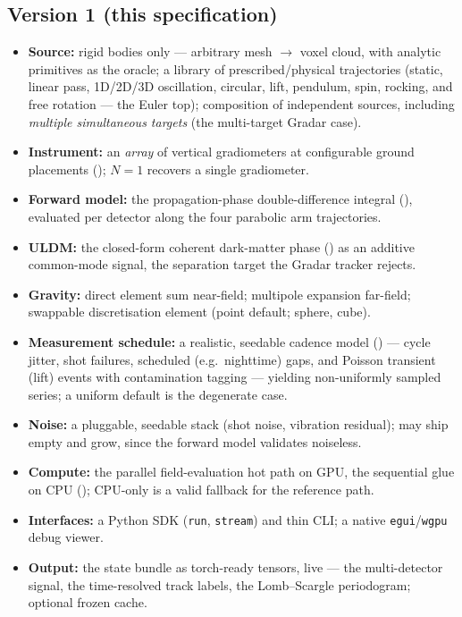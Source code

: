 \documentclass[11pt,a4paper]{article}
\theoremstyle{reqstyle}
\begin{document}
\subsection{Version 1 (this specification)}
\begin{itemize}[leftmargin=*,nosep]
\item \textbf{Source:} rigid bodies only --- arbitrary mesh $\to$ voxel cloud, with analytic
primitives as the oracle; a library of prescribed/physical trajectories (static, linear
pass, 1D/2D/3D oscillation, circular, lift, pendulum, spin, rocking, and free rotation --- the
Euler top); composition of independent sources,
including \emph{multiple simultaneous targets} (the multi-target Gradar case).
\item \textbf{Instrument:} an \emph{array} of vertical gradiometers at configurable ground
placements (); $N{=}1$ recovers a single gradiometer.
\item \textbf{Forward model:} the propagation-phase double-difference integral
(), evaluated per detector along the four parabolic arm trajectories.
\item \textbf{ULDM:} the closed-form coherent dark-matter phase () as an
additive common-mode signal, the separation target the Gradar tracker rejects.
\item \textbf{Gravity:} direct element sum near-field; multipole expansion far-field;
swappable discretisation element (point default; sphere, cube).
\item \textbf{Measurement schedule:} a realistic, seedable cadence model
() --- cycle jitter, shot failures, scheduled (e.g.\ nighttime) gaps, and
Poisson transient (lift) events with contamination tagging --- yielding non-uniformly sampled
series; a uniform default is the degenerate case.
\item \textbf{Noise:} a pluggable, seedable stack (shot noise, vibration residual); may
ship empty and grow, since the forward model validates noiseless.
\item \textbf{Compute:} the parallel field-evaluation hot path on GPU, the sequential glue on
CPU (); CPU-only is a valid fallback for the reference path.
\item \textbf{Interfaces:} a Python SDK (\texttt{run}, \texttt{stream}) and thin CLI; a
native \texttt{egui}/\texttt{wgpu} debug viewer.
\item \textbf{Output:} the state bundle as torch-ready tensors, live --- the multi-detector
signal, the time-resolved track labels, the Lomb--Scargle periodogram; optional frozen cache.
\end{itemize}
\end{document}
